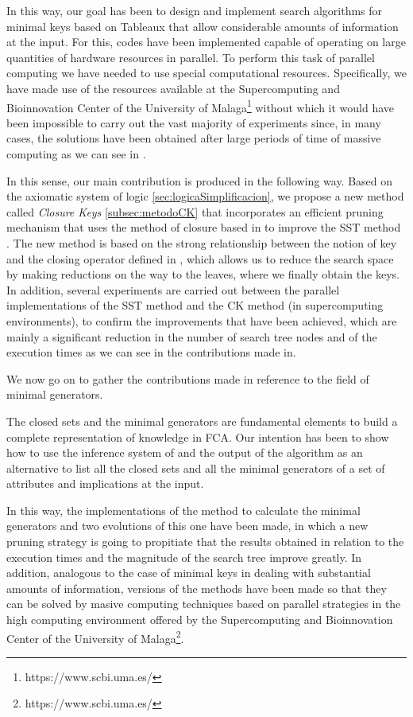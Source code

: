 In this way, our goal has been to design and implement search algorithms for minimal keys based on Tableaux that allow considerable amounts of information at the input. For this, codes have been implemented capable of operating on large quantities of hardware resources in parallel. To perform this task of parallel computing we have needed to use special computational resources. Specifically, we have made use of the resources available at the Supercomputing and Bioinnovation Center of the University of Malaga\footnote{https://www.scbi.uma.es/} without which it would have been impossible to carry out the vast majority of experiments since, in many cases, the solutions have been obtained after large periods of time of massive computing as we can see in \cite{Benito-Picazo2014, Benito-Picazo2016}.

In this sense, our main contribution is produced in the following way. Based on the axiomatic system of logic \slfde \ref{sec:logicaSimplificacion}, we propose a new method called \textit{Closure Keys} \ref{subsec:metodoCK} that incorporates an efficient pruning mechanism that uses the method of closure based in \slfde to improve the SST method \cite{CorderoEMG14}. The new method is based on the strong relationship between the notion of key and the closing operator defined in \cite{Mora2012}, which allows us to reduce the search space by making reductions on the way to the leaves, where we finally obtain the keys. In addition, several experiments are carried out between the parallel implementations of the SST method and the CK method (in supercomputing environments), to confirm the improvements that have been achieved, which are mainly a significant reduction in the number of search tree nodes and of the execution times as we can see in the contributions made in\cite{Benito-PicazoCMMSE2015, Benito-Picazo2016}.

\vspace{0.3cm}

We now go on to gather the contributions made in reference to the field of minimal generators.

The closed sets and the minimal generators are fundamental elements to build a complete representation of knowledge in FCA. Our intention has been to show how to use the inference system of \slfde \cite{Enciso2002, Cordero2012} and the output of the algorithm \cierree as an alternative to list all the closed sets and all the minimal generators of a set of attributes and implications at the input.

In this way, the implementations of the method to calculate the minimal generators and two evolutions of this one have been made, in which a new pruning strategy is going to propitiate that the results obtained in relation to the execution times and the magnitude of the search tree improve greatly. In addition, analogous to the case of minimal keys in dealing with substantial amounts of information, versions of the methods have been made so that they can be solved by masive computing techniques based on parallel strategies in the high computing environment offered by the Supercomputing and Bioinnovation Center of the University of Malaga\footnote{https://www.scbi.uma.es/}.


